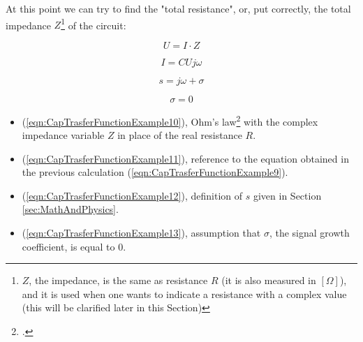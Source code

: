 \documentclass[a4paper, 10pt, final]{article} %
\begin{document}
    \noindent At this point we can try to find the "total resistance", or, put correctly, the total impedance $Z$\footnote{$Z$, the impedance, is the same as resistance $R$ (it is also measured in $[\Omega]$), and it is used when one wants to indicate a resistance with a complex value (this will be clarified later in this Section)} of the circuit:
    \begin{figure}[H]
        \centering
        \begin{minipage}[b]{.21\linewidth}
            \centering
            \begin{equation} \label{eqn:CapTrasferFunctionExample10}
                U = I \cdot Z
            \end{equation}
        \end{minipage}
        \hspace{0.04\linewidth}
        \begin{minipage}[b]{.21\linewidth}
            \centering
            \begin{equation} \label{eqn:CapTrasferFunctionExample11}
                I = C U j \omega
            \end{equation}
        \end{minipage}
        \hspace{0.04\linewidth}
        \begin{minipage}[b]{.21\linewidth}
            \centering
            \begin{equation} \label{eqn:CapTrasferFunctionExample12}
                s = j\omega + \sigma
            \end{equation}
        \end{minipage}
        \hspace{0.04\linewidth}
        \begin{minipage}[b]{.21\linewidth}
            \centering
            \begin{equation} \label{eqn:CapTrasferFunctionExample13}
                \sigma = 0
            \end{equation}
        \end{minipage}
    \end{figure}
    \begin{itemize}
        \item (\ref{eqn:CapTrasferFunctionExample10}), Ohm's law\footcite[]{Ohm:Wiki} with the complex impedance variable $Z$ in place of the real resistance $R$.
        \item (\ref{eqn:CapTrasferFunctionExample11}), reference to the equation obtained in the previous calculation (\ref{eqn:CapTrasferFunctionExample9}).
        \item (\ref{eqn:CapTrasferFunctionExample12}), definition of $s$ given in Section \ref{sec:MathAndPhysics}.
        \item (\ref{eqn:CapTrasferFunctionExample13}), assumption that $\sigma$, the signal growth coefficient, is equal to $0$.
    \end{itemize}
\end{document}

